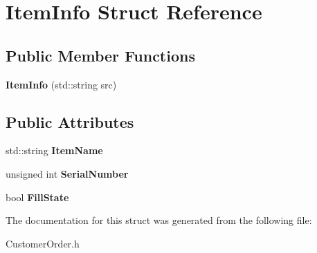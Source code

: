 \hypertarget{struct_item_info}{}\section{Item\+Info Struct Reference}
\label{struct_item_info}
\subsection*{Public Member Functions}
\begin{DoxyCompactItemize}
\item 
\mbox{\label{struct_item_info_aae5f84bd3f117f37547f074b2a49a85e}} 
{\bfseries Item\+Info} (std\+::string src)
\end{DoxyCompactItemize}
\subsection*{Public Attributes}
\begin{DoxyCompactItemize}
\item 
\mbox{\label{struct_item_info_ae443b3ad2e7a2d7b70aa48b72948fab0}} 
std\+::string {\bfseries Item\+Name}
\item 
\mbox{\label{struct_item_info_af47c788cac4e53c9c3f08e8602d4e622}} 
unsigned int {\bfseries Serial\+Number}
\item 
\mbox{\label{struct_item_info_aba6969821f7becd562a2d5d159b7e978}} 
bool {\bfseries Fill\+State}
\end{DoxyCompactItemize}


The documentation for this struct was generated from the following file\+:\begin{DoxyCompactItemize}
\item 
Customer\+Order.\+h\end{DoxyCompactItemize}
